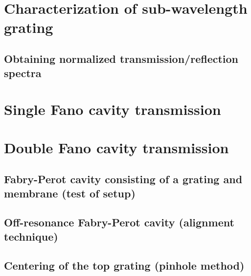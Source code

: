 \section{Characterization of sub-wavelength grating}

\subsection{Obtaining normalized transmission/reflection spectra}

\section{Single Fano cavity transmission} 

\section{Double Fano cavity transmission}

\subsection{Fabry-Perot cavity consisting of a grating and membrane (test of setup)}

\subsection{Off-resonance Fabry-Perot cavity (alignment technique)}

\subsection{Centering of the top grating (pinhole method)}
